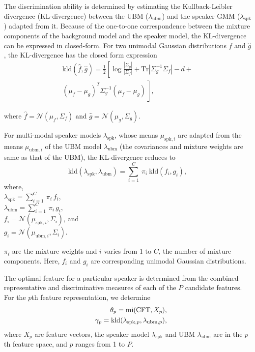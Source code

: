 \documentclass[preprint,12pt,5p]{elsarticle}
\begin{document}
The discrimination ability is determined by estimating the Kullback-Leibler divergence
(KL-divergence) between the UBM ($\lambda_{\textrm{ubm}}$) and the speaker GMM ($\lambda_{\textrm{spk}}$)
adapted from it. Because of the one-to-one
correspondence between the mixture components of the background model and the speaker model, 
the KL-divergence can be expressed in closed-form. For two unimodal Gaussian distributions
$\hat{f}$ and $\hat{g}$, the KL-divergence has the closed form expression
\begin{equation}
\begin{split}
\textrm{kld}(\hat{f},\hat{g}) = \frac{1}{2}\left[ \log \frac{|\Sigma_g|}{|\Sigma_f|} +
	\textrm{Tr}|\Sigma^{-1}_g\Sigma_f| - d + \right. \\ 
\left. (\mu_f-\mu_g)^T\Sigma_g^{-1}(\mu_f-\mu_g) \frac{}{} \right], 
\end{split}
\label{eq:kldGaussians}
\end{equation}

where $\hat{f} = \mathcal{N}(\mu_f,\Sigma_f)$ and $\hat{g} = \mathcal{N}(\mu_g,\Sigma_g)$.

For multi-modal speaker models $\lambda_{\textrm{spk}}$, whose means
$\mu_{\textrm{spk},i}$ are adapted from the means $\mu_{\textrm{ubm},i}$ of the UBM
model $\lambda_{\textrm{ubm}}$ (the covariances and mixture weights are same as
that of the UBM), the KL-divergence reduces to 
\begin{equation}
\textrm{kld}(\lambda_{\textrm{spk}},\lambda_{\textrm{ubm}}) = 
	\displaystyle \sum_{i=1}^{C}\ \pi_i\ \textrm{kld}(f_i,g_i),
\label{eq:gmmAdaptedKLD}
\end{equation}
where, \\
$\lambda_{\textrm{spk}} = \displaystyle \sum_{i=1}^C \, \pi_i \, f_i$, \\
$\lambda_{\textrm{ubm}} = \displaystyle\sum_{i=1}^C \, \pi_i \, g_i$, \\
$f_i = \mathcal{N}(\mu_{\textrm{spk},i},\Sigma_i)$, and \\
$g_i = \mathcal{N}(\mu_{\textrm{ubm},i},\Sigma_i)$.

\noindent $\pi_i$ are the mixture weights and
$i$ varies from 1 to $C$, the number of mixture components. Here, $f_i$ and $g_i$ are
corresponding unimodal Gaussian distributions.


The optimal feature for a particular speaker is determined from the combined
representative and discriminative measures of each of the $P$ candidate
features. For the $p$th feature representation, we determine
\begin{eqnarray*}
\vspace{-3mm}
&& \theta_p = \textrm{mi}(\textrm{CFT},X_{p}), \\
&& \gamma_p =
\textrm{kld}(\lambda_{\textrm{spk},p},\lambda_{\textrm{ubm},p}),
\end{eqnarray*}
where $X_p$ are feature vectors, the speaker model $\lambda_{\textrm{spk}}$ and 
UBM $\lambda_{\textrm{ubm}}$ are in the $p$th feature space, and $p$ ranges from 1 to $P$.
\end{document}
